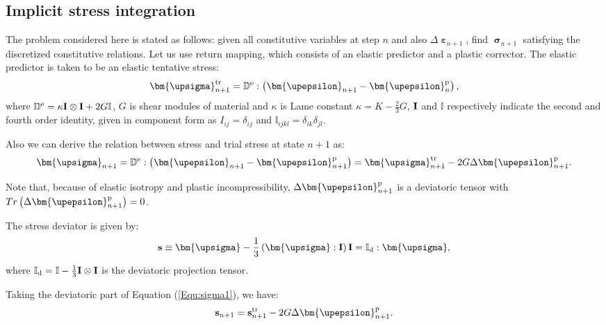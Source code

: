 \subsection{Implicit stress integration}
\noindent
The problem considered here is stated as follows: given all constitutive variables at step $n$ and also $\Delta {{\bm{\upepsilon }}_{n + 1}}$, find $\bm{\upsigma}_{n+1}$  satisfying the discretized constitutive relations. Let us use return mapping, which consists of an elastic predictor and a plastic corrector. The elastic predictor is taken to be an elastic tentative stress:
\begin{equation}
{\bm{\upsigma }}_{n + 1}^{\rm{tr}} = {\mathbb{D}^{\rm{e}}}:\left( {{{\bm{\upepsilon }}_{n + 1}} - {\bm{\upepsilon }}_n^{\rm{p}}} \right),
\end{equation}
where ${\mathbb{D}^{\rm{e}}} = \kappa {\bf{I}} \otimes {\bf{I}} + 2G\mathbb{I}$, $G$ is shear modules of material and $\kappa$ is Lame constant $\kappa  = K - \frac{2}{3}G$, ${\bf{I}}$ and $\mathbb{I}$ respectively indicate the second and fourth order identity, given in component form as ${I_{ij}} = {\delta _{ij}}$ and ${\mathbb{I}_{ijkl}} = {\delta _{ik}}{\delta _{jl}}$.

Also we can derive the relation between stress and trial stress at state $n+1$ as:
\begin{equation}
\label{Equ:sigma1}
{{\bm{\upsigma }}_{n + 1}^{} = {\mathbb{D}^{\rm{e}}}:\left( {{\bm{\upepsilon }}_{n + 1}^{} - {\bm{\upepsilon }}_{n + 1}^{\rm{p}}} \right)} = {\bm{\upsigma }}_{n + 1}^{\rm{tr}} - 2G\Delta {\bm{\upepsilon }}_{n + 1}^{\rm{p}}.
\end{equation}

Note that, because of elastic isotropy and plastic incompressibility, $\Delta {\bm{\upepsilon }}_{n + 1}^{\rm{p}}$ is a deviatoric tensor with $Tr\left( {\Delta {\bm{\upepsilon }}_{n + 1}^{\rm{p}}} \right)=0$.

The stress deviator is given by:
\begin{equation}
{\bf{s}} \equiv {\bm{\upsigma }} - \frac{1}{3}\left( {{\bm{\upsigma }}:{\bf{I}}} \right){\bf{I}} = {\mathbb{I}_{\rm{d}}}:{\bm{\upsigma }},
\end{equation}
where ${\mathbb{I}_{\rm{d}}} = \mathbb{I} - \frac{1}{3}{\bf{I}} \otimes {\bf{I}}$ is the deviatoric projection tensor.

Taking the deviatoric part of Equation (\ref{Equ:sigma1}), we have:
\begin{equation}
{{\bf{s}}_{n + 1}} = {\bf{s}}_{n + 1}^{\rm{tr}} - 2G\Delta {\bm{\upepsilon }}_{n + 1}^{\rm{p}}.
\end{equation}

